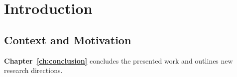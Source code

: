 \chapter{Introduction}  \label{ch:intro}

\section{Context and Motivation}      \label{sec:motivation}

\textbf{Chapter~\ref{ch:conclusion}} concludes the presented work and outlines new research directions.
